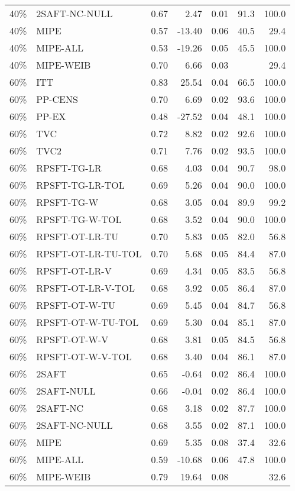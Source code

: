 \begin{table}[ht]
{\begin{tabular}{llrrrrr}
  40\% & 2SAFT-NC-NULL & 0.67 & 2.47 & 0.01 & 91.3 & 100.0 \\ 
  40\% & MIPE & 0.57 & -13.40 & 0.06 & 40.5 & 29.4 \\ 
  40\% & MIPE-ALL & 0.53 & -19.26 & 0.05 & 45.5 & 100.0 \\ 
  40\% & MIPE-WEIB & 0.70 & 6.66 & 0.03 &  & 29.4 \\ 
   \hline
60\% & ITT & 0.83 & 25.54 & 0.04 & 66.5 & 100.0 \\ 
  60\% & PP-CENS & 0.70 & 6.69 & 0.02 & 93.6 & 100.0 \\ 
  60\% & PP-EX & 0.48 & -27.52 & 0.04 & 48.1 & 100.0 \\ 
  60\% & TVC & 0.72 & 8.82 & 0.02 & 92.6 & 100.0 \\ 
  60\% & TVC2 & 0.71 & 7.76 & 0.02 & 93.5 & 100.0 \\ 
   \hline
60\% & RPSFT-TG-LR & 0.68 & 4.03 & 0.04 & 90.7 & 98.0 \\ 
  60\% & RPSFT-TG-LR-TOL & 0.69 & 5.26 & 0.04 & 90.0 & 100.0 \\ 
  60\% & RPSFT-TG-W & 0.68 & 3.05 & 0.04 & 89.9 & 99.2 \\ 
  60\% & RPSFT-TG-W-TOL & 0.68 & 3.52 & 0.04 & 90.0 & 100.0 \\ 
  60\% & RPSFT-OT-LR-TU & 0.70 & 5.83 & 0.05 & 82.0 & 56.8 \\ 
  60\% & RPSFT-OT-LR-TU-TOL & 0.70 & 5.68 & 0.05 & 84.4 & 87.0 \\ 
  60\% & RPSFT-OT-LR-V & 0.69 & 4.34 & 0.05 & 83.5 & 56.8 \\ 
  60\% & RPSFT-OT-LR-V-TOL & 0.68 & 3.92 & 0.05 & 86.4 & 87.0 \\ 
   \hline
60\% & RPSFT-OT-W-TU & 0.69 & 5.45 & 0.04 & 84.7 & 56.8 \\ 
  60\% & RPSFT-OT-W-TU-TOL & 0.69 & 5.30 & 0.04 & 85.1 & 87.0 \\ 
  60\% & RPSFT-OT-W-V & 0.68 & 3.81 & 0.05 & 84.5 & 56.8 \\ 
  60\% & RPSFT-OT-W-V-TOL & 0.68 & 3.40 & 0.04 & 86.1 & 87.0 \\ 
   \hline
60\% & 2SAFT & 0.65 & -0.64 & 0.02 & 86.4 & 100.0 \\ 
  60\% & 2SAFT-NULL & 0.66 & -0.04 & 0.02 & 86.4 & 100.0 \\ 
  60\% & 2SAFT-NC & 0.68 & 3.18 & 0.02 & 87.7 & 100.0 \\ 
  60\% & 2SAFT-NC-NULL & 0.68 & 3.55 & 0.02 & 87.1 & 100.0 \\ 
  60\% & MIPE & 0.69 & 5.35 & 0.08 & 37.4 & 32.6 \\ 
  60\% & MIPE-ALL & 0.59 & -10.68 & 0.06 & 47.8 & 100.0 \\ 
  60\% & MIPE-WEIB & 0.79 & 19.64 & 0.08 &  & 32.6 \\ 
   \hline
\end{tabular}
}
\end{table}
